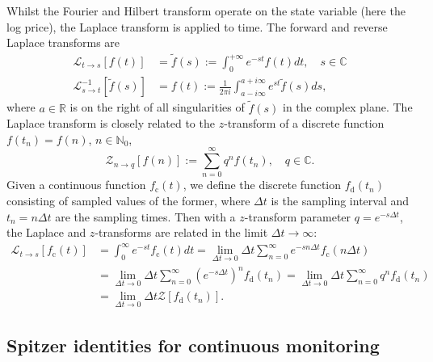 \documentclass[11pt,a4paper]{article}
\begin{document}
Whilst the Fourier and Hilbert transform operate on the state variable (here the log price), the Laplace transform is applied to time. The forward and reverse Laplace transforms are
\begin{align}
\mathcal{L}_{t\rightarrow s}[f(t)]&=\widetilde{f}(s):=\int_{0}^{+\infty}e^{-st}f(t)dt\label{eq:fwdLap}, \quad s\in\mathbb{C}\\
\mathcal{L}_{s\rightarrow t}^{-1}[\widetilde{f}(s)]&= f(t) := \frac{1}{2\pi i}\int^{a+i\infty}_{a-i\infty} e^{st}\widetilde{f}(s)ds,\label{eq:invLap}
\end{align}
where $a\in\mathbb{R}$ is on the right of all singularities of $\widetilde{f}(s)$ in the complex plane. The Laplace transform is closely related to the $z$-transform of a discrete function $f(t_n) = f(n)$, $n\in\mathbb{N}_0$,
\begin{equation}
\label{eq:ZFor}
\mathcal{Z}_{n\rightarrow q}[f(n)]:=\sum_{n=0}^\infty q^n f(t_n),\quad q\in\mathbb{C}.
\end{equation}
Given a continuous function $f_{\mathrm{c}}(t)$, we define the discrete function $f_{\mathrm{d}}(t_n)$ consisting of sampled values of the former, where $\Delta t$ is the sampling interval and $t_n=n\Delta t$ are the sampling times. Then with a $z$-transform parameter $q=e^{-s\Delta t}$, the Laplace and $z$-transforms are related in the limit $\Delta t\rightarrow\infty$:
\begin{align}
\label{eq:ztolap}
\mathcal{L}_{t\rightarrow s}[f_{\mathrm{c}}(t)]&=\int_0^\infty e^{-st}f_{\mathrm{c}}(t)dt
=\lim_{\Delta t\rightarrow0}\Delta t\sum_{n=0}^\infty e^{-sn\Delta t} f_\mathrm{c}(n\Delta t) \nonumber \\
& =\lim_{\Delta t\rightarrow0}\Delta t\sum_{n=0}^\infty (e^{-s\Delta t})^n f_\mathrm{d}(t_n)
=\lim_{\Delta t\rightarrow0}\Delta t\sum_{n=0}^\infty q^nf_\mathrm{d}(t_n) \nonumber\\
& =\lim_{\Delta t\rightarrow0}\Delta t \mathcal{Z}\left[f_\mathrm{d}(t_n)\right].
\end{align}

\subsection{Spitzer identities for continuous monitoring}\label{sec:back_spitzer}
\end{document}
